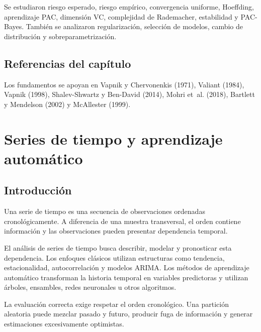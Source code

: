 \documentclass[
  spanish,
  10.5pt,
  letterpaper,
  DIV=11,
  numbers=noendperiod,
  oneside,
  open=any]{scrreprt}
\theoremstyle{definition}
\theoremstyle{definition}
\theoremstyle{plain}
\theoremstyle{remark}
\begin{document}

Se estudiaron riesgo esperado, riesgo empírico, convergencia uniforme,
Hoeffding, aprendizaje PAC, dimensión VC, complejidad de Rademacher,
estabilidad y PAC-Bayes. También se analizaron regularización, selección
de modelos, cambio de distribución y sobreparametrización.

\section*{Referencias del
capítulo}\label{referencias-del-capuxedtulo-20}


Los fundamentos se apoyan en Vapnik y Chervonenkis (1971), Valiant
(1984), Vapnik (1998), Shalev-Shwartz y Ben-David (2014), Mohri et~al.
(2018), Bartlett y Mendelson (2002) y McAllester (1999).

\chapter{\texorpdfstring{Series de tiempo y
aprendizaje
automático}{Series de tiempo y aprendizaje automático}}\label{sec-series-tiempo}

\section*{Introducción}\label{introducciuxf3n-22}


Una serie de tiempo es una secuencia de observaciones ordenadas
cronológicamente. A diferencia de una muestra transversal, el orden
contiene información y las observaciones pueden presentar dependencia
temporal.

El análisis de series de tiempo busca describir, modelar y pronosticar
esta dependencia. Los enfoques clásicos utilizan estructuras como
tendencia, estacionalidad, autocorrelación y
modelos ARIMA. Los métodos de aprendizaje automático
transforman la historia temporal en variables predictoras y utilizan
árboles, ensambles, redes neuronales u otros algoritmos.

La evaluación correcta exige respetar el orden cronológico. Una
partición aleatoria puede mezclar pasado y futuro, producir fuga de
información y generar estimaciones excesivamente optimistas.
\end{document}
